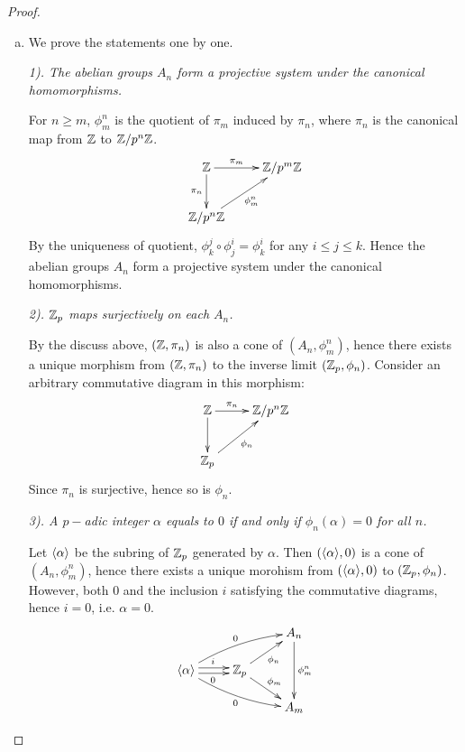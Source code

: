   \begin{proof}
    \begin{enumerate}[a)]
      \item We prove the statements one by one.

        \emph{1). The abelian groups $A_n$ form a projective system under the canonical homomorphisms.}

        For $n\geqslant m$, $\phi^n_m$ is the quotient of $\pi_m$ induced by $\pi_n$, where $\pi_n$ is the canonical map from ${\mathbb Z}$ to ${\mathbb Z}/p^n{\mathbb Z}$.
        \begin{displaymath}
          \xymatrix{
             \ZZ\ar[r]^-{\pi_m}\ar[d]_-{\pi_n} & \ZZ/p^m\ZZ            \\
             \ZZ/p^n\ZZ\ar[ur]_{\phi^n_m} & }
        \end{displaymath}
        By the uniqueness of quotient, $\phi^j_k\circ \phi^i_j = \phi^i_k$ for any $i \leqslant j \leqslant k$. Hence the abelian groups $A_n$ form a projective system under the canonical homomorphisms.

        \emph{2). ${\mathbb Z}_p$ maps surjectively on each $A_n$.}

        By the discuss above, $({\mathbb Z},\pi_n)$ is also a cone of $(A_n,\phi^n_m)$, hence there exists a unique morphism from $({\mathbb Z},\pi_n)$ to the inverse limit $({\mathbb Z}_p,\phi_n)$. Consider an arbitrary commutative diagram in this morphism:
        \begin{displaymath}
          \xymatrix{
             \ZZ\ar[r]^-{\pi_n}\ar[d] & \ZZ/p^n\ZZ            \\
             \ZZ_p\ar[ur]_{\phi_n} & }
        \end{displaymath}
        Since $\pi_n$ is surjective, hence so is $\phi_n$.

        \emph{3). A $p-$adic integer $\alpha$ equals to $0$ if and only if $\phi_n(\alpha)=0$ for all $n$. }

        Let $\langle\alpha\rangle$ be the subring of ${\mathbb Z}_p$ generated by $\alpha$. Then $(\langle\alpha\rangle,0)$ is a cone of $(A_n,\phi^n_m)$, hence there exists a unique morohism from $(\langle\alpha\rangle,0)$ to $({\mathbb Z}_p,\phi_n)$. However, both $0$ and the inclusion $i$ satisfying the commutative diagrams, hence $i=0$, i.e. $\alpha=0$.
      \begin{displaymath}
        \xymatrix@R=0.5cm{
               & &         A_n\ar[dd]^{\phi^n_m}     \\
            \<\alpha\>\ar@/^/[urr]^{0}\ar@/_/[drr]_{0}\ar@<0.5ex>[r]^{i}\ar@<-0.5ex>[r]_{0}
               & \ZZ_p \ar[ur]_{\phi_n} \ar[dr]^{\phi_m}                 \\
               & &         A_m                 }
      \end{displaymath}


\end{enumerate}
\end{proof}
